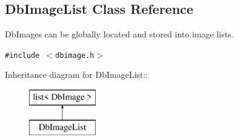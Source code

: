 \subsection{Db\-Image\-List  Class Reference}
\label{class_dbimagelist}
Db\-Images can be globally located and stored into image lists. 


{\tt \#include $<$dbimage.h$>$}

Inheritance diagram for Db\-Image\-List::\begin{figure}[H]
\begin{center}
\leavevmode
\includegraphics[height=2cm]{class_dbimagelist}
\end{center}
\end{figure}
